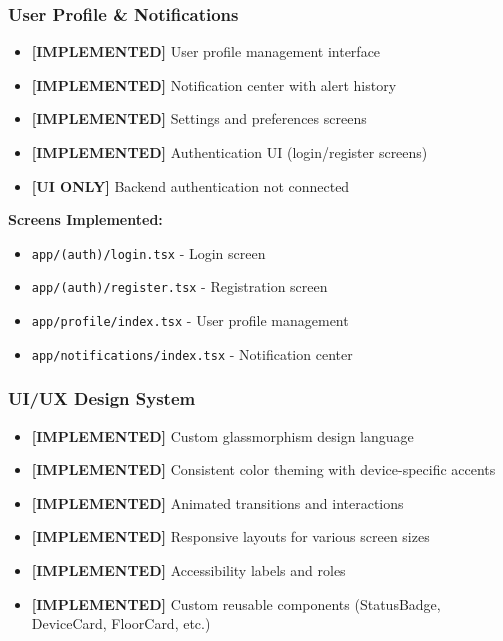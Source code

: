 \documentclass[12pt,a4paper]{article}
\begin{document}
\subsubsection{User Profile \& Notifications}
\begin{itemize}[leftmargin=*]
    \item \textcolor{implemented}{\textbf{[IMPLEMENTED]}} User profile management interface
    \item \textcolor{implemented}{\textbf{[IMPLEMENTED]}} Notification center with alert history
    \item \textcolor{implemented}{\textbf{[IMPLEMENTED]}} Settings and preferences screens
    \item \textcolor{implemented}{\textbf{[IMPLEMENTED]}} Authentication UI (login/register screens)
    \item \textcolor{pending}{\textbf{[UI ONLY]}} Backend authentication not connected
\end{itemize}

\textbf{Screens Implemented:}
\begin{itemize}
    \item \texttt{app/(auth)/login.tsx} - Login screen
    \item \texttt{app/(auth)/register.tsx} - Registration screen
    \item \texttt{app/profile/index.tsx} - User profile management
    \item \texttt{app/notifications/index.tsx} - Notification center
\end{itemize}

\subsubsection{UI/UX Design System}
\begin{itemize}[leftmargin=*]
    \item \textcolor{implemented}{\textbf{[IMPLEMENTED]}} Custom glassmorphism design language
    \item \textcolor{implemented}{\textbf{[IMPLEMENTED]}} Consistent color theming with device-specific accents
    \item \textcolor{implemented}{\textbf{[IMPLEMENTED]}} Animated transitions and interactions
    \item \textcolor{implemented}{\textbf{[IMPLEMENTED]}} Responsive layouts for various screen sizes
    \item \textcolor{implemented}{\textbf{[IMPLEMENTED]}} Accessibility labels and roles
    \item \textcolor{implemented}{\textbf{[IMPLEMENTED]}} Custom reusable components (StatusBadge, DeviceCard, FloorCard, etc.)
\end{itemize}
\end{document}
